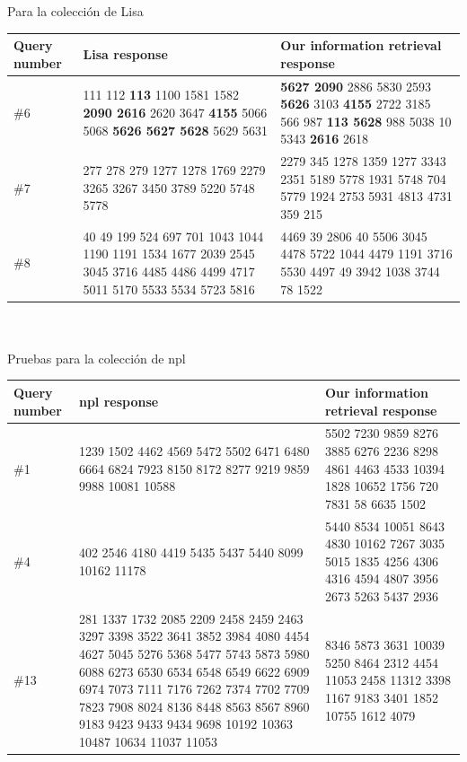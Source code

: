 \documentclass{llncs}
\begin{document}
Para la colección de Lisa

\begin{tabular}{|p{2.5cm}|p{4.5cm}|p{4cm}|} \hline
Query number & Lisa response & Our information retrieval response \\ \hline
\#6 & 111 112 \textbf{113} 1100 1581 1582 \textbf{2090 2616} 2620 3647 \textbf{4155} 5066 5068 \textbf{5626 5627 5628} 5629 5631 & \textbf{5627 2090} 2886 5830 2593 \textbf{5626} 3103 \textbf{4155} 2722 3185 566 987 \textbf{113 5628} 988 5038 10 5343 \textbf{2616} 2618 \\ \hline
\#7 & 277 278 279 1277 1278 1769 2279 3265 3267 3450 3789 5220 5748 5778 & 2279 345 1278 1359 1277 3343 2351 5189 5778 1931 5748 704 5779 1924 2753 5931 4813 4731 359 215 \\ \hline
\#8 & 40 49 199 524 697 701 1043 1044 1190 1191 1534 1677 2039 2545 3045 3716 4485 4486 4499 4717 5011 5170 5533 5534 5723 5816 & 4469 39 2806 40 5506 3045 4478 5722 1044 4479 1191 3716 5530 4497 49 3942 1038 3744 78 1522 \\ \hline
\end{tabular} \\\\

Pruebas para la colección de npl

\begin{tabular}{|p{2.5cm}|p{4.5cm}|p{4cm}|} \hline
Query number & npl response & Our information retrieval response \\ \hline
\#1 & 1239  1502  4462  4569  5472  5502  6471  6480  6664  6824 7923  8150  8172  8277  9219  9859  9988 10081 10588 & 5502 7230 9859 8276 3885 6276 2236 8298 4861 4463 4533 10394 1828 10652 1756 720 7831 58 6635 1502 \\ \hline
\#4 & 402  2546  4180  4419  5435  5437  5440  8099 10162 11178 & 5440 8534 10051 8643 4830 10162 7267 3035 5015 1835 4256 4306 4316 4594 4807 3956 2673 5263 5437 2936 \\ \hline
\#13 & 281  1337  1732  2085  2209  2458  2459  2463  3297  3398 3522  3641  3852  3984  4080  4454  4627  5045  5276  5368 5477  5743  5873  5980  6088  6273  6530  6534  6548  6549 6622  6909  6974  7073  7111  7176  7262  7374  7702  7709 7823  7908  8024  8136  8448  8563  8567  8960  9183  9423 9433  9434  9698 10192 10363 10487 10634 11037 11053 & 8346 5873 3631 10039 5250 8464 2312 4454 11053 2458 11312 3398 1167 9183 3401 1852 10755 1612 4079 \\ \hline
\end{tabular}
\end{document}
